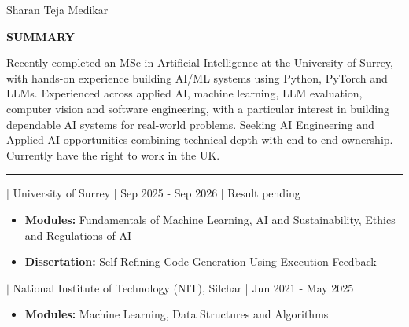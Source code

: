 \documentclass[a4paper]{article}
\newcommand{\cvsection}[1]{\par\vspace{7.0pt}{\fontsize{11}{11}\selectfont\bfseries\MakeUppercase{#1}}\par\vspace{1pt}\hrule\vspace{2.5pt}}
\newcommand{\entry}[2]{{\bfseries #1} $|$ #2\par}
\begin{document}
\fontsize{9.5}{9.9}\selectfont
\begin{center}{\fontsize{21.5}{22}\selectfont Sharan Teja Medikar}\par{}\end{center}\vspace{2pt}
\colorbox{gray!14}{\parbox{\dimexpr\linewidth-2\fboxsep}{\textbf{SUMMARY}\par\vspace{2pt}Recently completed an MSc in Artificial Intelligence at the University of Surrey, with hands-on experience building AI/ML systems using Python, PyTorch and LLMs. Experienced across applied AI, machine learning, LLM evaluation, computer vision and software engineering, with a particular interest in building dependable AI systems for real-world problems. Seeking AI Engineering and Applied AI opportunities combining technical depth with end-to-end ownership. Currently have the right to work in the UK.}}
\par\vspace{1.0pt}\cvsection{Education}\entry{MSc in Artificial Intelligence}{University of Surrey | Sep 2025 - Sep 2026 | Result pending}\begin{itemize}\item \textbf{Modules:} Fundamentals of Machine Learning, AI and Sustainability, Ethics and Regulations of AI\item \textbf{Dissertation:} Self-Refining Code Generation Using Execution Feedback\end{itemize}\vspace{2.0pt}\entry{BTech in Computer Science and Engineering}{National Institute of Technology (NIT), Silchar | Jun 2021 - May 2025}\begin{itemize}\item \textbf{Modules:} Machine Learning, Data Structures and Algorithms\end{itemize}
\end{document}

